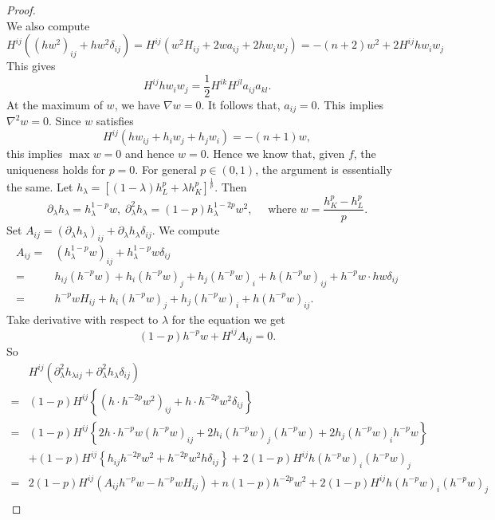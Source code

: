 \documentclass[reqno]{amsart}
\theoremstyle{remark}
\theoremstyle{plain}
\begin{document}
\begin{proof}
\begin{equation}
\end{equation}
We also compute
\begin{equation}
     H^{ij}((hw^2)_{ij}+hw^2\delta_{ij})=H^{ij}(w^2 H_{ij}+2w a_{ij}+2hw_iw_{j})=-(n+2)w^2+2H^{ij}hw_iw_j
\end{equation}
This gives
\begin{equation}
    H^{ij} hw_iw_j=\frac{1}{2}H^{ik}H^{jl}a_{ij}a_{kl}.
\end{equation}
At the maximum of $w$, we have $\nabla w=0$.  It follows that, $a_{ij}=0$. This implies $\nabla^2 w=0$. Since $w$ satisfies
\[
H^{ij}(h w_{ij}+h_iw_j+h_jw_i)=-(n+1)w,
\]
this implies $\max w=0$ and hence $w=0$. 
Hence we know that, given $f$, the uniqueness holds for $p=0$. 
For general $p\in (0,1)$, the argument is essentially the same. Let $h_\lambda=[(1-\lambda)h_L^p+\lambda h_K^p]^{\frac{1}{p}}$. Then \[
\partial_\lambda h_\lambda=h_\lambda^{1-p}w,\; \partial_\lambda^2h_\lambda=(1-p)h^{1-2p}_{\lambda}w^2, \quad \text{ where } w=\frac{h_K^p-h_L^p}{p}.
\]Set $A_{ij}=(\partial_\lambda h_\lambda)_{ij}+\partial_\lambda h_\lambda \delta_{ij}$. We compute \[\begin{aligned}
A_{ij}=&(h_\lambda^{1-p}w)_{ij}+h^{1-p}_\lambda w\delta_{ij}\\
=&h_{ij}(h^{-p}w)+h_{i}(h^{-p}w)_j+h_{j}(h^{-p}w)_i+h(h^{-p}w)_{ij}+h^{-p}w\cdot hw\delta_{ij}\\
=&h^{-p}wH_{ij}+h_{i}(h^{-p}w)_j+h_{j}(h^{-p}w)_i+h(h^{-p}w)_{ij}.
\end{aligned}
\]
Take derivative with respect to $\lambda$ for the equation we get \begin{equation}
    (1-p)h^{-p}w+H^{ij}A_{ij}=0.
\end{equation}
So \begin{equation}
    \begin{aligned}
        &H^{ij}(\partial^2_\lambda h_{\lambda ij}+\partial^2_\lambda h_\lambda \delta_{ij})\\
        =&(1-p)H^{ij}\left\{(h\cdot h^{-2p}w^2)_{ij} + h\cdot h^{-2p}w^2\delta_{ij}\right\}   \\
        =&(1-p)H^{ij}\left\{2h\cdot h^{-p}w(h^{-p}w)_{ij}+2h_i(h^{-p}w)_j(h^{-p}w)+2h_j(h^{-p}w)_ih^{-p}w\right\} \\
        &+(1-p)H^{ij}\left\{h_{ij}h^{-2p}w^2+h^{-2p}w^2h\delta_{ij}\right\}+2(1-p)H^{ij}h(h^{-p}w)_{i}(h^{-p}w)_j\\
        =&2(1-p)H^{ij}(A_{ij}h^{-p}w-h^{-p}wH_{ij})+n(1-p)h^{-2p}w^2+2(1-p)H^{ij}h(h^{-p}w)_{i}(h^{-p}w)_j\\

\end{aligned}
\end{equation}
\end{proof}
\end{document}
